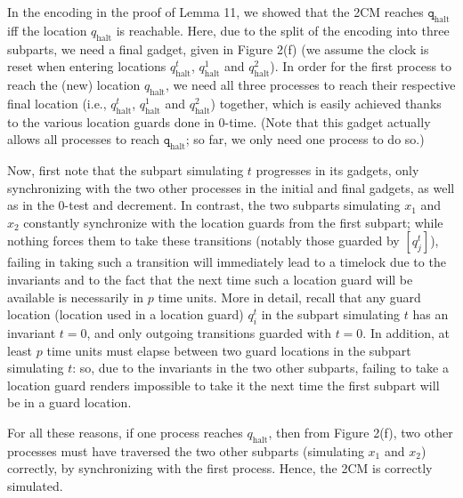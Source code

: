  
 
In the encoding in the proof of Lemma 11, we showed that the 2CM reaches $\mathtt{q}_{\textrm{halt}}$ iff the location $q_{\textrm{halt}}$ is reachable. Here, due to the split of the encoding into three subparts, we need a final gadget, given in Figure 2(f) (we assume the clock is reset when entering locations $q_{\textrm{halt}}^{t}$, $q_{\textrm{halt}}^{1}$ and $q_{\textrm{halt}}^{2}$). In order for the first process to reach the (new) location $q_{\textrm{halt}}$, we need all three processes to reach their respective final location (i.e., $q_{\textrm{halt}}^{t}$, $q_{\textrm{halt}}^{1}$ and $q_{\textrm{halt}}^{2}$) together, which is easily achieved thanks to the various location guards done in 0-time. (Note that this gadget actually allows all processes to reach $\mathtt{q}_{\textrm{halt}}$; so far, we only need one process to do so.)\par
 
 
 
Now, first note that the subpart simulating $t$ progresses in its gadgets, only synchronizing with the two other processes in the initial and final gadgets, as well as in the 0-test and decrement. In contrast, the two subparts simulating $x_{1}$ and $x_{2}$ constantly synchronize with the location guards from the first subpart; while nothing forces them to take these transitions (notably those guarded by $[q_{j}^{t}]$), failing in taking such a transition will immediately lead to a timelock due to the invariants and to the fact that the next time such a location guard will be available is necessarily in $p$ time units. More in detail, recall that any guard location (location used in a location guard) $q_{i}^{t}$ in the subpart simulating $t$ has an invariant $t=0$, and only outgoing transitions guarded with $t=0$. In addition, at least $p$ time units must elapse between two guard locations in the subpart simulating $t$: so, due to the invariants in the two other subparts, failing to take a location guard renders impossible to take it the next time the first subpart will be in a guard location.\par
 
 
 
For all these reasons, if one process reaches $q_{\textrm{halt}}$, then from Figure 2(f), two other processes must have traversed the two other subparts (simulating $x_{1}$ and $x_{2}$) correctly, by synchronizing with the first process. Hence, the 2CM is correctly simulated.\par
 
